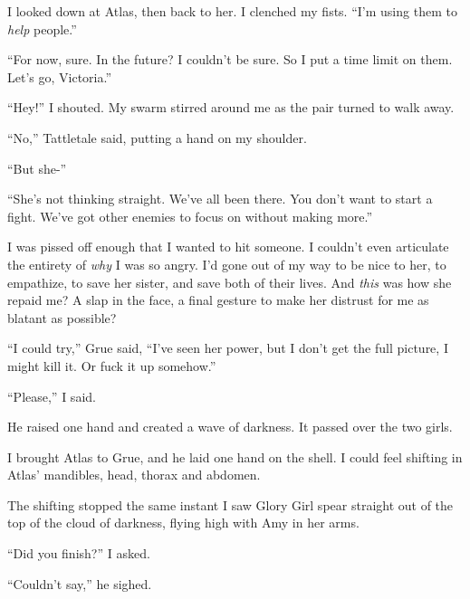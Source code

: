I looked down at Atlas, then back to her.  I clenched my fists.  ``I'm using them to \emph{help} people.''



``For now, sure.  In the future?  I couldn't be sure.  So I put a time limit on them.  Let's go, Victoria.''



``Hey!''  I shouted.  My swarm stirred around me as the pair turned to walk away.



``No,'' Tattletale said, putting a hand on my shoulder.



``But she-''



``She's not thinking straight.  We've all been there.  You don't want to start a fight.  We've got other enemies to focus on without making more.''



I was pissed off enough that I wanted to hit someone.  I couldn't even articulate the entirety of \emph{why} I was so angry.  I'd gone out of my way to be nice to her, to empathize, to save her sister, and save both of their lives.  And \emph{this} was how she repaid me?  A slap in the face, a final gesture to make her distrust for me as blatant as possible?



``I could try,'' Grue said, ``I've seen her power, but I don't get the full picture, I might kill it.  Or fuck it up somehow.''



``Please,'' I said.



He raised one hand and created a wave of darkness.  It passed over the two girls.



I brought Atlas to Grue, and he laid one hand on the shell.  I could feel shifting in Atlas' mandibles, head, thorax and abdomen.



The shifting stopped the same instant I saw Glory Girl spear straight out of the top of the cloud of darkness, flying high with Amy in her arms.



``Did you finish?''  I asked.



``Couldn't say,'' he sighed.



